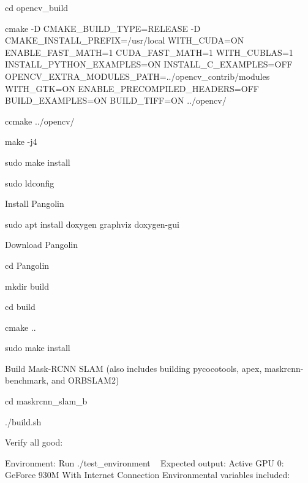 \begin{DoxyItemize}
\begin{DoxyEnumerate}
\item cd opencv\+\_\+build
\item cmake -\/D C\+M\+A\+K\+E\+\_\+\+B\+U\+I\+L\+D\+\_\+\+T\+Y\+PE=R\+E\+L\+E\+A\+SE -\/D C\+M\+A\+K\+E\+\_\+\+I\+N\+S\+T\+A\+L\+L\+\_\+\+P\+R\+E\+F\+IX=/usr/local W\+I\+T\+H\+\_\+\+C\+U\+DA=ON E\+N\+A\+B\+L\+E\+\_\+\+F\+A\+S\+T\+\_\+\+M\+A\+TH=1 C\+U\+D\+A\+\_\+\+F\+A\+S\+T\+\_\+\+M\+A\+TH=1 W\+I\+T\+H\+\_\+\+C\+U\+B\+L\+AS=1 I\+N\+S\+T\+A\+L\+L\+\_\+\+P\+Y\+T\+H\+O\+N\+\_\+\+E\+X\+A\+M\+P\+L\+ES=ON I\+N\+S\+T\+A\+L\+L\+\_\+\+C\+\_\+\+E\+X\+A\+M\+P\+L\+ES=O\+FF O\+P\+E\+N\+C\+V\+\_\+\+E\+X\+T\+R\+A\+\_\+\+M\+O\+D\+U\+L\+E\+S\+\_\+\+P\+A\+TH=../opencv\+\_\+contrib/modules W\+I\+T\+H\+\_\+\+G\+TK=ON E\+N\+A\+B\+L\+E\+\_\+\+P\+R\+E\+C\+O\+M\+P\+I\+L\+E\+D\+\_\+\+H\+E\+A\+D\+E\+RS=O\+FF B\+U\+I\+L\+D\+\_\+\+E\+X\+A\+M\+P\+L\+ES=ON B\+U\+I\+L\+D\+\_\+\+T\+I\+FF=ON ../opencv/
\item ccmake ../opencv/
\item make -\/j4
\item sudo make install
\item sudo ldconfig
\end{DoxyEnumerate}
\item Install Pangolin
\begin{DoxyEnumerate}
\item sudo apt install doxygen graphviz doxygen-\/gui
\item Download Pangolin
\item cd Pangolin
\item mkdir build
\item cd build
\item cmake ..
\item sudo make install
\end{DoxyEnumerate}
\item Build Mask-\/\+R\+C\+NN S\+L\+AM (also includes building pycocotools, apex, maskrcnn-\/benchmark, and O\+R\+B\+S\+L\+A\+M2)
\begin{DoxyEnumerate}
\item cd maskrcnn\+\_\+slam\+\_\+b
\item ./build.sh
\end{DoxyEnumerate}
\item Verify all good\+:
\begin{DoxyEnumerate}
\item Environment\+: Run ./test\+\_\+environment ~\newline
 Expected output\+: Active G\+PU 0\+: Ge\+Force 930M With Internet Connection Environmental variables included\+:

\end{DoxyEnumerate}
\end{DoxyItemize}

